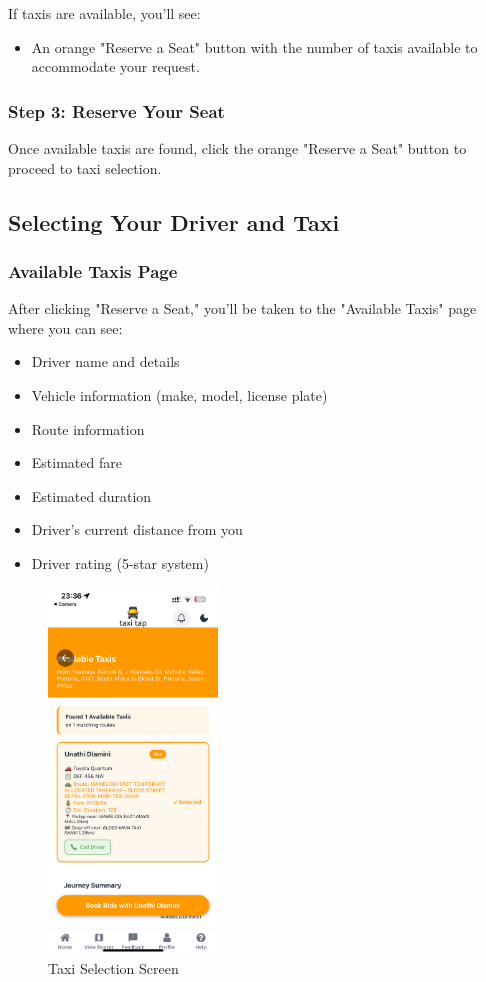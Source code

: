 \documentclass[12pt]{article}
\begin{document}
If taxis are available, you'll see:
\begin{itemize}
    \item An orange "Reserve a Seat" button with the number of taxis available to accommodate your request.
\end{itemize}

\subsubsection{Step 3: Reserve Your Seat}
Once available taxis are found, click the orange "Reserve a Seat" button to proceed to taxi selection.

\subsection{Selecting Your Driver and Taxi}

\subsubsection{Available Taxis Page}
After clicking "Reserve a Seat," you'll be taken to the "Available Taxis" page where you can see:

\begin{itemize}
    \item Driver name and details
    \item Vehicle information (make, model, license plate)
    \item Route information
    \item Estimated fare
    \item Estimated duration
    \item Driver's current distance from you
    \item Driver rating (5-star system)
\end{itemize}

\begin{figure}[H]
  \centering
  \includegraphics[width=0.4\textwidth]{taxi_selection.png}
  \caption{Taxi Selection Screen}
\end{figure}
\end{document}
